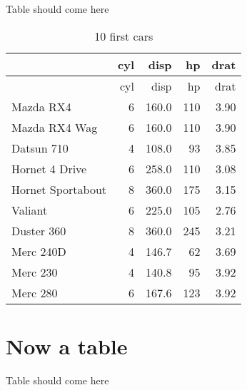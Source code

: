 \documentclass[]{article}
\begin{document}
Table should come here

\begin{longtable}[]{@{}lrrrr@{}}
\caption{10 first cars}\tabularnewline
\toprule
& cyl & disp & hp & drat\tabularnewline
\midrule
\endfirsthead
\toprule
& cyl & disp & hp & drat\tabularnewline
\midrule
\endhead
Mazda RX4 & 6 & 160.0 & 110 & 3.90\tabularnewline
Mazda RX4 Wag & 6 & 160.0 & 110 & 3.90\tabularnewline
Datsun 710 & 4 & 108.0 & 93 & 3.85\tabularnewline
Hornet 4 Drive & 6 & 258.0 & 110 & 3.08\tabularnewline
Hornet Sportabout & 8 & 360.0 & 175 & 3.15\tabularnewline
Valiant & 6 & 225.0 & 105 & 2.76\tabularnewline
Duster 360 & 8 & 360.0 & 245 & 3.21\tabularnewline
Merc 240D & 4 & 146.7 & 62 & 3.69\tabularnewline
Merc 230 & 4 & 140.8 & 95 & 3.92\tabularnewline
Merc 280 & 6 & 167.6 & 123 & 3.92\tabularnewline
\bottomrule
\end{longtable}

\lipsum

\section{Now a table}\label{now-a-table-5}

\lipsum

Table should come here
\end{document}
